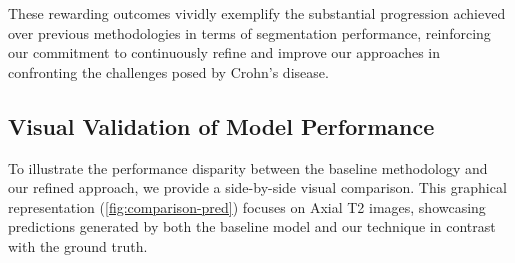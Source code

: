 These rewarding outcomes vividly exemplify the substantial progression achieved over previous methodologies in terms of segmentation performance, reinforcing our commitment to continuously refine and improve our approaches in confronting the challenges posed by Crohn's disease.
\subsection{Visual Validation of Model Performance}
To illustrate the performance disparity between the baseline methodology and our refined approach, we provide a side-by-side visual comparison. This graphical representation (\autoref{fig:comparison-pred}) focuses on Axial T2 images, showcasing predictions generated by both the baseline model and our technique in contrast with the ground truth.

